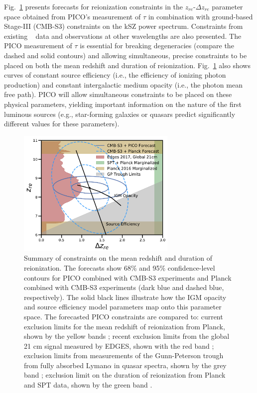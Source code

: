 \documentclass[PICOReport.tex]{subfiles}
\begin{document}
Fig.~\ref{fig:ReionizationPICO} presents forecasts for reionization constraints in the $z_{re}$-$\Delta z_{re}$ parameter space obtained from PICO's measurement of $\tau$ in combination with ground-based Stage-III (CMB-S3) constraints on the kSZ power spectrum.  Constraints from existing \planck~ data and observations at other wavelengths are also presented.  The PICO measurement of $\tau$ is essential for breaking degeneracies (compare the dashed and solid contours) and allowing simultaneous, precise constraints to be placed on both the mean redshift and duration of reionization.  Fig.~\ref{fig:ReionizationPICO} also shows curves of constant source efficiency (i.e., the efficiency of ionizing photon production) and constant intergalactic medium opacity (i.e., the photon mean free path).  PICO will allow simultaneous constraints to be placed on these physical parameters, yielding important information on the nature of the first luminous sources (e.g., star-forming galaxies or quasars predict significantly different values for these parameters).

\begin{figure}
\hspace{-0.in}
\parbox{3.1in}{\centerline {
\includegraphics[width=3.0in]{images/Reionization_Contours_zbar_delz_PICO_NEW.pdf} } }
\hspace{0.in}
\parbox{3.5in}{
\caption{\label{fig:ReionizationPICO} Summary of constraints on the mean redshift and duration of reionization. The forecasts show 68\% and 95\% confidence-level contours for PICO combined with CMB-S3 experiments and Planck combined with CMB-S3 experiments (dark blue and dashed blue, respectively). The solid black lines illustrate how the IGM opacity and source efficiency model parameters map onto this parameter space. The forecasted PICO constraints are compared to: current exclusion limits for the mean redshift of reionization from Planck, shown by the yellow bands \citealp{planck2018:parameters}; recent exclusion limits from the global 21 cm signal measured by EDGES, shown with the red band \citealp{edges2017}; exclusion limits from measurements of the Gunn-Peterson trough from fully absorbed Lyman$\alpha$ in quasar spectra, shown by the grey band \citealp{Fan2006}; exclusion limit on the duration of reionization from Planck and SPT data, shown by the green band \citealp{planck_reio:2016}.} }
\vspace{-0.1in}
\end{figure}
\end{document}
